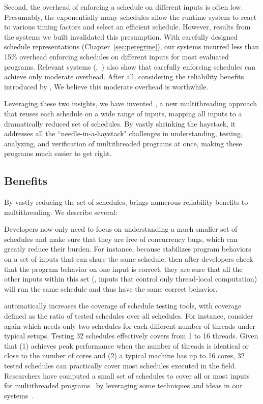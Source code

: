 Second, the overhead of enforcing a schedule on different inputs is often low.
Presumably, the exponentially many schedules allow the
runtime system to react to various timing factors and select an
efficient schedule.  However, results from the \smt systems we built
invalidated this presumption.  With carefully designed schedule
representations (Chapter~\ref{sec:peregrine}), our systems incurred less than
15\%
overhead enforcing schedules on different inputs for most evaluated programs.
Relevant systems (\eg,~\cite{kendo:asplos09, determinator:osdi10}) also show
that
carefully enforcing schedules can achieve only moderate overhead. After all,
considering the reliability benefits introduced by \smt, We believe
this moderate overhead is worthwhile.

Leveraging these two insights, we have invented \smt,
a new multithreading approach that reuses each schedule on a wide range of
inputs, mapping all inputs to a dramatically reduced set of schedules.
By vastly shrinking the haystack, it addresses all the ``needle-in-a-haystack"
challenges in understanding, testing, analyzing, and verification of
multithreaded programs at once, making these programs much easier to get
right.

\subsection{Benefits}

By vastly reducing the set of schedules, \smt brings numerous reliability
benefits to multithreading.  We describe several:

 Developers now only need to focus on understanding a much
smaller set of schedules and make sure that they are free of concurrency bugs, 
which
can greatly reduce their burden. For instance, because \smt stabilizes program
behaviors on a set of inputs that can share the same schedule, then
after developers check that the program behavior on one input is correct, they
are sure that all the other inputs within this set (\eg, inputs that control
only thread-local computation) will run the same schedule and thus have the same
correct behavior.

 \smt automatically
increases the coverage of schedule testing tools, with coverage
defined as the ratio of tested schedules over all schedules.
For instance, consider \pbzip again which needs only two
schedules for each different number of threads under typical setups.  Testing 32
schedules effectively covers from 1 to 16 threads.  Given that (1) \pbzip
achieves peak performance when the number of threads is identical or close to
the number of cores and (2) a typical machine has up to 16 cores, 32 tested
schedules can practically cover most schedules executed in the field.
Researchers have computed a small set of schedules to cover all or most
inputs for multithreaded programs~\cite{bergan:oopsla13} by leveraging some
techniques and ideas in our \smt systems~\cite{cui:tern:osdi10,
peregrine:sosp11}.

